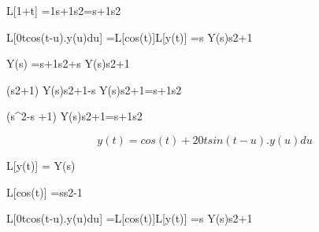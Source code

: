L[1+t] =1s+1s2=s+1s2

 

L[0tcos(t-u).y(u)du] =L[cos(t)]L[y(t)] =s Y(s)s2+1

 

Y(s) =s+1s2+s Y(s)s2+1

 

(s2+1) Y(s)s2+1-s Y(s)s2+1=s+1s2

 

(s^2-s +1) Y(s)s2+1=s+1s2

 

 


 \[ y(t) = cos(t)+ 20tsin(t-u).y(u)du\]


 

 

L[y(t)] = Y(s)

 

L[cos(t)] =ss2-1

 

L[0tcos(t-u).y(u)du] =L[cos(t)]L[y(t)] =s Y(s)s2+1


